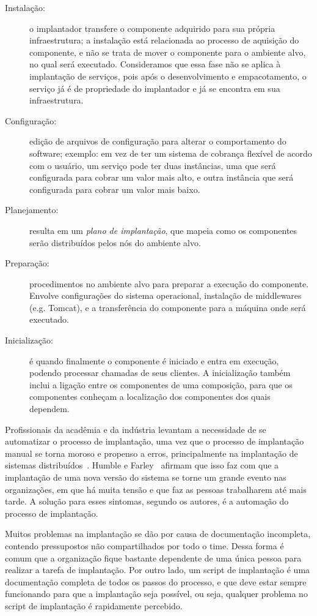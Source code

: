 \begin{description}
\item [Instalação:] o implantador transfere o componente adquirido para sua própria infraestrutura; a instalação está relacionada ao processo de aquisição do componente, e não se trata de mover o componente para o ambiente alvo, no qual será executado. Consideramos que essa fase não se aplica à implantação de serviços, pois após o desenvolvimento e empacotamento, o serviço já é de propriedade do implantador e já se encontra em sua infraestrutura.
\item [Configuração:] edição de arquivos de configuração para alterar o comportamento do software; exemplo: em vez de ter um sistema de cobrança flexível de acordo com o usuário, um serviço pode ter duas instâncias, uma que será configurada para cobrar um valor mais alto, e outra instância que será configurada para cobrar um valor mais baixo. 
\item [Planejamento:] resulta em um \emph{plano de implantação}, que mapeia como os componentes serão distribuídos pelos nós do ambiente alvo.  
\item [Preparação:] procedimentos no ambiente alvo para preparar a execução do componente. Envolve configurações do sistema operacional, instalação de middlewares (e.g. Tomcat), e a transferência do componente para a máquina onde será executado. 
\item [Inicialização:] é quando finalmente o componente é iniciado e entra em execução, podendo processar chamadas de seus clientes. A inicialização também inclui a ligação entre os componentes de uma composição, para que os componentes conheçam a localização dos componentes dos quais dependem.
\end{description}

Profissionais da acadêmia e da indústria levantam a necessidade de se automatizar o processo de implantação, uma vez que o processo de implantação manual se torna moroso e propenso a erros, principalmente na implantação de sistemas distribuídos~\cite{Humble2011Continuous,Dolstra2005Configuration}. 
Humble e Farley~\cite{Humble2011Continuous} afirmam que isso faz com que  
a implantação de uma nova versão do sistema se torne um grande evento nas organizações, 
em que há muita tensão e que faz as pessoas trabalharem até mais tarde.
A solução para esses sintomas, segundo os autores, é a automação do processo de implantação.

Muitos problemas na implantação se dão por causa de documentação incompleta,
contendo pressupostos não compartilhados por todo o time.
Dessa forma é comum que a organização fique bastante dependente de uma única
pessoa para realizar a tarefa de implantação.
Por outro lado, um script de implantação é uma documentação completa de todos os passos
do processo, e que deve estar sempre funcionando para que a implantação seja possível,
ou seja, qualquer problema no script de implantação é rapidamente percebido.

